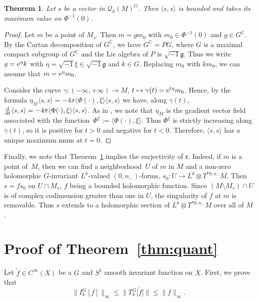 \documentclass[10pt,a4paper]{amsart}
\numberwithin{equation}{section}
\newtheorem{Theorem}{Theorem}[section]
\begin{document}
	\begin{Theorem} \label{thm:final}
		Let $s$ be a vector in $\mathcal{Q}_k(M)^G$. Then $\langle s, s \rangle$ is bounded and takes its maximum value on $\Phi^{-1}(0)$.
	\end{Theorem}
	\begin{proof}
		Let $m$ be a point of $M_s$. Then $m=g m_0$ with $m_0\in \Phi^{-1}(0)$ and $g\in G^{\mathbb{C}}$. By the Cartan decomposition of $G^{\mathbb{C}}$, we have $G^{\mathbb{C}}=P G$, where $G$ is a maximal compact subgroup of $G^{\mathbb{C}}$ and the Lie algebra of $P$ is $\sqrt{-1} \mathfrak{g}$. Thus we write $g={\rm e}^{\eta} k$ with $\eta =\sqrt{-1} \xi\in \sqrt{-1} \mathfrak{g}$ and $k\in G$. Replacing $m_0$ with $k m_0$, we can assume that $m={\rm e}^{\eta} m_0$.
		
		Consider the curve $\gamma \colon (-\infty, +\infty)\rightarrow M$, $ t\mapsto \gamma(t)={\rm e}^{t \eta} m_0$. Hence, by the formula
$\eta_M\langle s, s\rangle=-4\pi \langle\Phi(\cdot), \xi\rangle \langle s, s \rangle$
		we have, along $\gamma(t)$,
$\frac{{\rm d}}{{\rm d}t}\langle s, s\rangle=-4\pi \langle\Phi(\cdot), \xi\rangle \langle s, s \rangle$.
		As in \cite[Lemma 4.7]{gs}, we note that $\eta_M$ is the gradient vector field associated with the function~${\Phi^{\xi}:=\langle\Phi(\cdot), \xi\rangle}$. Thus $\Phi^{\xi}$ is strictly increasing along $\gamma(t)$, so it is positive
		for $t>0$ and negative for $t<0$. Therefore, $\langle s, s \rangle$ has a unique maximum mum at $t=0$.
	\end{proof}
 	
 	Finally, we note that Theorem~\ref{thm:final} implies the surjectivity of $\mathfrak{r}$. Indeed,
 	if $m$ is a point of~$M$, then we can find a neighborhood~$U$ of $m$ in $M$ and a non-zero holomorphic $G$-invariant $L^k$-valued $(0, n_-)$-forms, $s_0 \colon U\rightarrow L^k\otimes T^{*0,n_-}M $. Then $s =f s_0$ on $U\cap M_s$, $f$ being a bounded holomorphic function. Since $(M\setminus M_s)\cap U$ is of complex codimension greater than one in $U$, the singularity of $f$ at $m$ is removable. Thus $s$ extends to a holomorphic section of $L^k\otimes T^{*0,n_-}M $ over all of $M$.
 	 	
\section[Proof of Theorem \ref{thm:quant}]{Proof of Theorem~\ref{thm:quant}}
	\label{sec:proofoftheorem}
	
	Let $\widetilde f\in C^{\infty}(X)$ be a $G$ and $S^1$ smooth invariant function on $X$. First, we prove that
	\begin{equation} \label{eq:ineq}
		\big\lVert I_{k}^G[f] \big\rVert_{\infty} \leq \big\rVert T^{G}_k\big[\widetilde{f}\big]\big\lVert \leq \lVert f\rVert_{\infty} .
	\end{equation}
\end{document}
